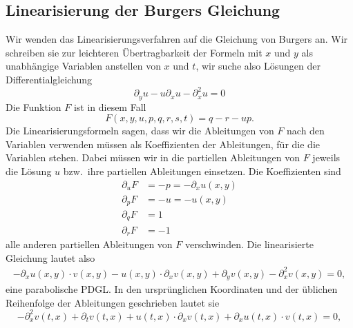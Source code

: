 \subsection{Linearisierung der Burgers Gleichung}
Wir wenden das Linearisierungsverfahren auf die Gleichung von Burgers an.
Wir schreiben sie zur leichteren Übertragbarkeit der Formeln
mit $x$ und $y$ als unabhängige Variablen anstellen von $x$ und $t$,
wir suche also Lösungen der Differentialgleichung
\[
\partial_yu-u\partial_xu-\partial_x^2u=0
\]
Die Funktion $F$ ist in diesem Fall
\[
F(x,y,u,p,q,r,s,t)=q-r-up.
\]
Die Linearisierungsformeln sagen, dass wir die Ableitungen von $F$ nach
den Variablen verwenden müssen als Koeffizienten der Ableitungen,
für die die Variablen stehen.  Dabei müssen wir in die partiellen Ableitungen
von $F$ jeweils die Lösung $u$ bzw.~ihre partiellen Ableitungen einsetzen.
Die Koeffizienten sind
\begin{align*}
\partial_uF&=-p=-\partial_xu(x,y)
\\
\partial_pF
&=-u=-u(x,y)
\\
\partial_qF
&=1
\\
\partial_rF
&=-1
\end{align*}
alle anderen partiellen Ableitungen von $F$ verschwinden. Die linearisierte
Gleichung lautet also
\begin{align*}
-\partial_xu(x,y)\cdot v(x,y)
-
u(x,y)\cdot\partial_xv(x,y)
+\partial_yv(x,y)
-\partial_x^2v(x,y)=0,
\end{align*}
eine parabolische PDGL. In den ursprünglichen Koordinaten und der
üblichen Reihenfolge der Ableitungen geschrieben
lautet sie
\[
-\partial_x^2v(t,x)
+\partial_tv(t,x)
+ u(t,x)\cdot\partial_xv(t,x)
+\partial_xu(t,x)\cdot v(t,x)
=0,
\]

